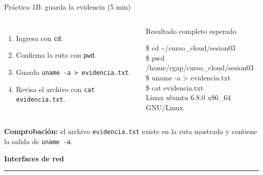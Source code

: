 \documentclass[aspectratio=169,10pt,c]{beamer}
\begin{document}
\begin{frame}{Práctica 1B: guarda la evidencia \textnormal{\small(5 min)}}
\begin{columns}[T,onlytextwidth]
\begin{enumerate}\setlength\itemsep{6pt}\small
  \item Ingresa con \texttt{cd}.
  \item Confirma la ruta con \texttt{pwd}.
  \item Guarda \texttt{uname -a > evidencia.txt}.
  \item Revisa el archivo con \texttt{cat evidencia.txt}.
\end{enumerate}
\begin{exampleblock}{Resultado completo esperado}
\begin{terminal}
\$ cd \textasciitilde/curso\_cloud/sesion03\\
\$ pwd\\
/home/rgap/curso\_cloud/sesion03\\
\$ uname -a > evidencia.txt\\
\$ cat evidencia.txt\\
Linux ubuntu 6.8.0 x86\_64 GNU/Linux
\end{terminal}
\end{exampleblock}
\end{columns}
\vspace{3mm}
\small\textbf{Comprobación:} el archivo \texttt{evidencia.txt} existe en la ruta mostrada y contiene la salida de \texttt{uname -a}.
\end{frame}

\begin{frame}[plain]
\vfill
\begin{center}
{\fontsize{29}{34}\selectfont\bfseries Interfaces de red}\par
\vspace{4mm}
{\color{utpRojo}\rule{8.5cm}{1.2pt}}
\end{center}
\vfill
\end{frame}
\end{document}
